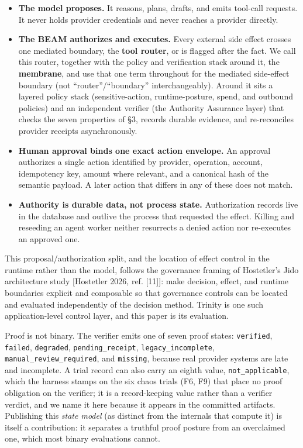 \documentclass[11pt]{article}
\providecommand{\tightlist}{%
 \setlength{\itemsep}{0pt}\setlength{\parskip}{0pt}}
\begin{document}
\begin{itemize}
\tightlist
\item
 \textbf{The model proposes.} It reasons, plans, drafts, and emits tool-call requests. It never
 holds provider credentials and never reaches a provider directly.
\item
 \textbf{The BEAM authorizes and executes.} Every external side effect crosses one mediated
 boundary, the \textbf{tool router}, or is flagged after the fact. We call this router, together
 with the policy and verification stack around it, the \textbf{membrane}, and use that one term
 throughout for the mediated side-effect boundary (not ``router''/``boundary'' interchangeably).
 Around it sits a layered policy stack (sensitive-action, runtime-posture, spend, and outbound
 policies) and an independent verifier (the Authority Assurance layer) that checks the seven
 properties of \S3, records durable evidence, and re-reconciles provider receipts asynchronously.
\item
 \textbf{Human approval binds one exact action envelope.} An approval authorizes a single action
 identified by provider, operation, account, idempotency key, amount where relevant, and a
 canonical hash of the semantic payload. A later action that differs in any of these does
 not match.
\item
 \textbf{Authority is durable data, not process state.} Authorization records live in the
 database and outlive the process that requested the effect. Killing and reseeding an agent
 worker neither resurrects a denied action nor re-executes an approved one.
\end{itemize}

This proposal/authorization split, and the location of effect control in the runtime rather
than the model, follows the governance framing of Hostetler's Jido architecture study
{[}Hostetler 2026, ref. {[}11{]}{]}: make decision, effect, and runtime boundaries explicit and
composable so that governance controls can be located and evaluated independently of the
decision method.
Trinity is one such application-level control layer, and this paper is its evaluation.

Proof is not binary. The verifier emits one of seven proof states: \texttt{verified},
\texttt{failed}, \texttt{degraded}, \texttt{pending\_receipt}, \texttt{legacy\_incomplete},
\texttt{manual\_review\_required}, and \texttt{missing}, because real provider systems are late and
incomplete. A trial record can also carry an eighth value, \texttt{not\_applicable}, which the
harness stamps on the six chaos trials (F6, F9) that place no proof obligation on the verifier; it
is a record-keeping value rather than a verifier verdict, and we name it here because it appears in
the committed artifacts. Publishing this \emph{state model} (as distinct
from the internals that compute it) is itself a contribution: it separates a truthful proof posture from an overclaimed one, which most binary evaluations cannot.
\end{document}
